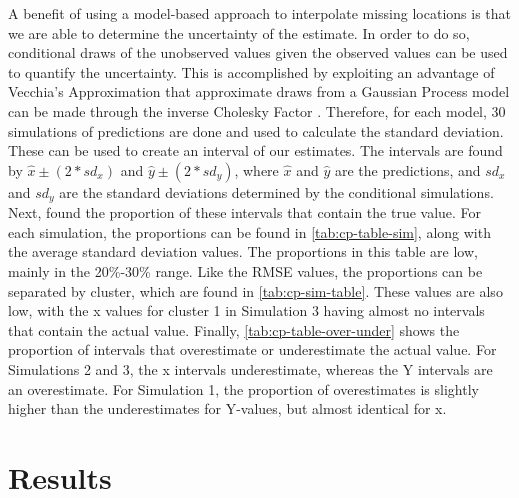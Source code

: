 \documentclass[12pt]{article}
\begin{document}
A benefit of using a model-based approach to interpolate missing
locations is that we are able to determine the uncertainty of the
estimate. In order to do so, conditional draws of the unobserved values
given the observed values can be used to quantify the uncertainty. This
is accomplished by exploiting an advantage of Vecchia's Approximation
that approximate draws from a Gaussian Process model can be made through
the inverse Cholesky Factor \citep{guinness_permutation_2018}.
Therefore, for each model, 30 simulations of predictions are done and
used to calculate the standard deviation. These can be used to create an
interval of our estimates. The intervals are found by
\(\hat{x} \pm (2*sd_x)\) and \(\hat{y} \pm (2*sd_y)\), where \(\hat{x}\)
and \(\hat{y}\) are the predictions, and \(sd_x\) and \(sd_y\) are the
standard deviations determined by the conditional simulations. Next,
found the proportion of these intervals that contain the true value. For
each simulation, the proportions can be found in
\cref{tab:cp-table-sim}, along with the average standard deviation
values. The proportions in this table are low, mainly in the 20\%-30\%
range. Like the RMSE values, the proportions can be separated by
cluster, which are found in \cref{tab:cp-sim-table}. These values are
also low, with the x values for cluster 1 in Simulation 3 having almost
no intervals that contain the actual value. Finally,
\cref{tab:cp-table-over-under} shows the proportion of intervals that
overestimate or underestimate the actual value. For Simulations 2 and 3,
the x intervals underestimate, whereas the Y intervals are an
overestimate. For Simulation 1, the proportion of overestimates is
slightly higher than the underestimates for Y-values, but almost
identical for x.

\hypertarget{results}{%
\section{Results}\label{results}}



\end{document}
